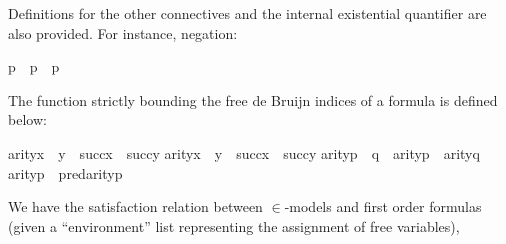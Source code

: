 Definitions for the other connectives and the internal existential
quantifier are also provided. For instance, negation:%
\begin{isabelle}%
{\isasymcdot}{\isasymnot}p{\isasymcdot}\ {\isasymequiv}\ {\isasymcdot}{\isasymnot}{\isacharparenleft}{\kern0pt}p\ {\isasymand}\ p{\isacharparenright}{\kern0pt}{\isasymcdot}%
\end{isabelle}%
The  function strictly bounding the free de Bruijn
indices of a formula is defined below:
\begin{isabelle}%
arity{\isacharparenleft}{\kern0pt}{\isasymcdot}x\ {\isasymin}\ y{\isasymcdot}{\isacharparenright}{\kern0pt}\ {\isacharequal}{\kern0pt}\ succ{\isacharparenleft}{\kern0pt}x{\isacharparenright}{\kern0pt}\ {\isasymunion}\ succ{\isacharparenleft}{\kern0pt}y{\isacharparenright}{\kern0pt}\isasep\isanewline%
arity{\isacharparenleft}{\kern0pt}{\isasymcdot}x\ {\isacharequal}{\kern0pt}\ y{\isasymcdot}{\isacharparenright}{\kern0pt}\ {\isacharequal}{\kern0pt}\ succ{\isacharparenleft}{\kern0pt}x{\isacharparenright}{\kern0pt}\ {\isasymunion}\ succ{\isacharparenleft}{\kern0pt}y{\isacharparenright}{\kern0pt}\isasep\isanewline%
arity{\isacharparenleft}{\kern0pt}{\isasymcdot}{\isasymnot}{\isacharparenleft}{\kern0pt}p\ {\isasymand}\ q{\isacharparenright}{\kern0pt}{\isasymcdot}{\isacharparenright}{\kern0pt}\ {\isacharequal}{\kern0pt}\ arity{\isacharparenleft}{\kern0pt}p{\isacharparenright}{\kern0pt}\ {\isasymunion}\ arity{\isacharparenleft}{\kern0pt}q{\isacharparenright}{\kern0pt}\isasep\isanewline%
arity{\isacharparenleft}{\kern0pt}{\isacharparenleft}{\kern0pt}{\isasymcdot}{\isasymforall}p{\isasymcdot}{\isacharparenright}{\kern0pt}{\isacharparenright}{\kern0pt}\ {\isacharequal}{\kern0pt}\ pred{\isacharparenleft}{\kern0pt}arity{\isacharparenleft}{\kern0pt}p{\isacharparenright}{\kern0pt}{\isacharparenright}{\kern0pt}%
\end{isabelle}%
We have the satisfaction relation between $\in$-models and
    first order formulas (given a “environment” list representing
    the assignment of free variables),%
